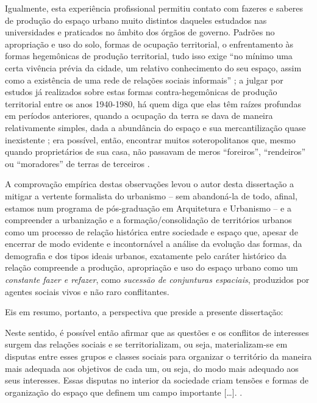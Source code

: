 Igualmente, esta experiência profissional permitiu contato com fazeres e saberes de produção do espaço urbano muito distintos daqueles estudados nas universidades e praticados no âmbito dos órgãos de governo. Padrões no apropriação e uso do solo, formas de ocupação territorial, o enfrentamento às formas hegemônicas de produção territorial, tudo isso exige ``no mínimo uma certa vivência prévia da cidade, um relativo conhecimento do seu espaço, assim como a existência de uma rede de relações sociais informais'' \cite[p.~40]{MATTEDI1981}; a julgar por estudos já realizados sobre estas formas contra-hegemônicas de produção territorial entre os anos 1940-1980, há quem diga que elas têm raízes profundas em períodos anteriores, quando a ocupação da terra se dava de maneira relativamente simples, dada a abundância do espaço e sua mercantilização quase inexistente \cite[p.~25]{MOURA1990}; era possível, então, encontrar muitos soteropolitanos que, mesmo quando proprietários de sua casa, não passavam de meros ``foreiros'', ``rendeiros'' ou ``moradores'' de terras de terceiros \cite[p.~139]{BRANDAO1980}.

A comprovação empírica destas observações levou o autor desta dissertação a mitigar a vertente formalista do urbanismo – sem abandoná-la de todo, afinal, estamos num programa de pós-graduação em Arquitetura e Urbanismo – e a compreender a urbanização e a formação/consolidação de territórios urbanos como um processo de relação histórica entre sociedade e espaço \cite{CASTELLS2000, SANTOS2008} que, apesar de encerrar de modo evidente e incontornável a análise da evolução das formas, da demografia e dos tipos ideais urbanos, exatamente pelo caráter histórico da relação compreende a produção, apropriação e uso do espaço urbano como um \textit{constante fazer e refazer}, como \textit{sucessão de conjunturas espaciais}, produzidos por agentes sociais vivos e não raro conflitantes.

Eis em resumo, portanto, a perspectiva que preside a presente dissertação:

\begin{citacao}
Neste sentido, é possível então afirmar que as questões e os conflitos de interesses surgem das relações sociais e se territorializam, ou seja, materializam-se em disputas entre esses grupos e classes sociais para organizar o território da maneira mais adequada aos objetivos de cada um, ou seja, do modo mais adequado aos seus interesses. Essas disputas no interior da sociedade criam tensões e formas de organização do espaço que definem um campo importante [\dots]. \cite[p.~41]{CASTRO2005}.
\end{citacao}

